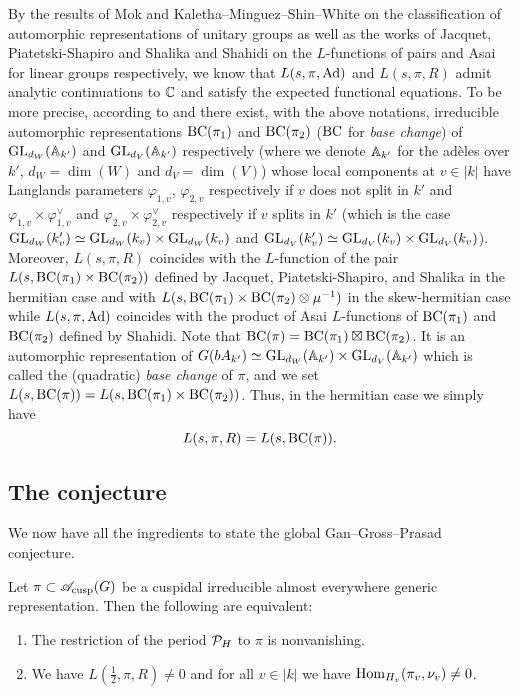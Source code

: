 By the results of Mok \cite{mok2015endoscopic} and Kaletha--Minguez--Shin--White \cite{kaletha2014endoscopic} on the classification of automorphic representations of unitary groups as well as the works of Jacquet, Piatetski-Shapiro and Shalika \cite{jacquet1983rankin} and Shahidi on the $L$-functions of pairs and Asai for linear groups respectively, we know that $L(s, \pi, \mathrm{Ad})$ and $L(s, \pi, R)$ admit analytic continuations to $\mathbb{C}$ and satisfy the expected functional equations.
To be more precise, according to \cite{mok2015endoscopic} and \cite{kaletha2014endoscopic} there exist, with the above notations, irreducible automorphic representations $\mathrm{BC}(\pi_1)$ and $\mathrm{BC}(\pi_2)$ ($\mathrm{BC}$ for \emph{base change}) of $\mathrm{GL}_{d_W}(\mathbb{A}_{k'})$ and $\mathrm{GL}_{d_V}(\mathbb{A}_{k'})$ respectively (where we denote $\mathbb{A}_{k'}$ for the ad\`eles over $k'$, $d_W = \dim(W)$ and $d_V = \dim(V)$) whose local components at $v \in |k|$ have Langlands parameters $\varphi_{1, v}$, $\varphi_{2, v}$ respectively if $v$ does not split in $k'$ and $\varphi_{1, v} \times \varphi_{1, v}^\vee$ and $\varphi_{2, v} \times \varphi_{2, v}^\vee$ respectively if $v$ splits in $k'$ (which is the case $\mathrm{GL}_{d_W}(k_v') \simeq \mathrm{GL}_{d_W}(k_v) \times \mathrm{GL}_{d_W}(k_v)$ and $\mathrm{GL}_{d_V}(k_v') \simeq \mathrm{GL}_{d_V}(k_v) \times \mathrm{GL}_{d_V}(k_v)$).
Moreover, $L(s, \pi, R)$ coincides with the $L$-function of the pair $L(s, \mathrm{BC}(\pi_1) \times \mathrm{BC}(\pi_2))$ defined by Jacquet, Piatetski-Shapiro, and Shalika \cite{jacquet1983rankin} in the hermitian case and with $L(s, \mathrm{BC}(\pi_1) \times \mathrm{BC}(\pi_2) \otimes \mu^{-1})$ in the skew-hermitian case while $L(s, \pi, \mathrm{Ad})$ coincides with the product of Asai $L$-functions of $\mathrm{BC}(\pi_1)$ and $\mathrm{BC}(\pi_2)$ defined by Shahidi.
Note that $\mathrm{BC}(\pi) = \mathrm{BC}(\pi_1) \boxtimes \mathrm{BC}(\pi_2)$.
It is an automorphic representation of $G(bA_{k'}) \simeq \mathrm{GL}_{d_W}(\mathbb{A}_{k'}) \times \mathrm{GL}_{d_V}(\mathbb{A}_{k'})$ which is called the (quadratic) \emph{base change} of $\pi$, and we set $L(s, \mathrm{BC}(\pi)) = L(s, \mathrm{BC}(\pi_1) \times \mathrm{BC}(\pi_2))$.
Thus, in the hermitian case we simply have
\[
    L(s, \pi, R) = L(s, \mathrm{BC}(\pi)).
\]


\subsection{The conjecture}

We now have all the ingredients to state the global Gan--Gross--Prasad conjecture.


\begin{conjecture}
\label{conj:global}
Let $\pi \subset \mathscr{A}_{\mathrm{cusp}}(G)$ be a cuspidal irreducible almost everywhere generic representation.
Then the following are equivalent:
\begin{enumerate}
    \item The restriction of the period $\mathcal{P}_H$ to $\pi$ is nonvanishing.
    \item We have $L(\frac{1}{2}, \pi, R) \neq 0$ and for all $v \in |k|$ we have $\mathrm{Hom}_{H_v}(\pi_v, \nu_v) \neq 0$.
\end{enumerate}
\end{conjecture}


